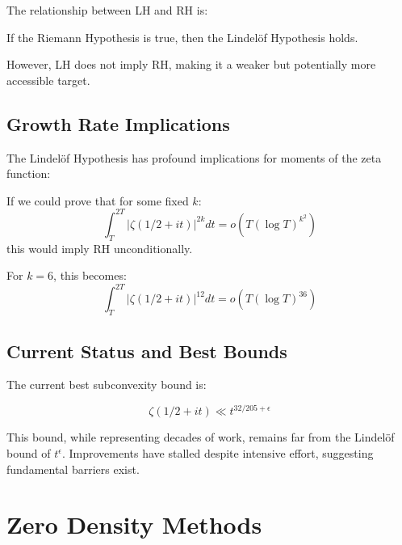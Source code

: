 The relationship between LH and RH is:

\begin{theorem}[RH Implies LH]
If the Riemann Hypothesis is true, then the Lindelöf Hypothesis holds.
\end{theorem}

However, LH does not imply RH, making it a weaker but potentially more accessible target.

\subsection{Growth Rate Implications}

The Lindelöf Hypothesis has profound implications for moments of the zeta function:

\begin{theorem}
If we could prove that for some fixed $k$:
\begin{equation}
\int_T^{2T} |\zeta(1/2 + it)|^{2k} dt = o(T(\log T)^{k^2})
\end{equation}
this would imply RH unconditionally.
\end{theorem}

For $k = 6$, this becomes:
\begin{equation}
\int_T^{2T} |\zeta(1/2 + it)|^{12} dt = o(T(\log T)^{36})
\end{equation}

\subsection{Current Status and Best Bounds}

The current best subconvexity bound is:

\begin{theorem}
\begin{equation}
\zeta(1/2 + it) \ll t^{32/205 + \epsilon}
\end{equation}
\end{theorem}

\begin{remark}
This bound, while representing decades of work, remains far from the Lindelöf bound of $t^{\epsilon}$. Improvements have stalled despite intensive effort, suggesting fundamental barriers exist.
\end{remark}

\section{Zero Density Methods}

